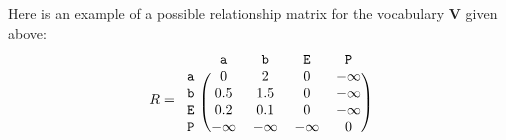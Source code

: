 \documentclass{article}
\newcommand{\ta}{\mathtt{a}}
\newcommand{\tb}{\mathtt{b}}
\newcommand{\tE}{\mathtt{E}}
\newcommand{\tP}{\mathtt{P}}
\newcommand{\bV}{\mathbf{V}}
\begin{document}
Here is an example of a possible relationship matrix for the
vocabulary $\bV$ given above: 
\begin{displaymath}
  R = 
    \begin{blockarray}{ccccc}
       & \ta & \tb & \tE & \tP  \\
      \begin{block}{c(cccc)}
        \ta & 0 & 2 & 0 & -\infty \\
        \tb & 0.5 & 1.5 & 0 & -\infty \\
        \tE & 0.2 & 0.1 & 0 & -\infty \\
        \tP & -\infty & -\infty & -\infty & 0 \\
      \end{block}
    \end{blockarray}
\end{displaymath}
\end{document}
